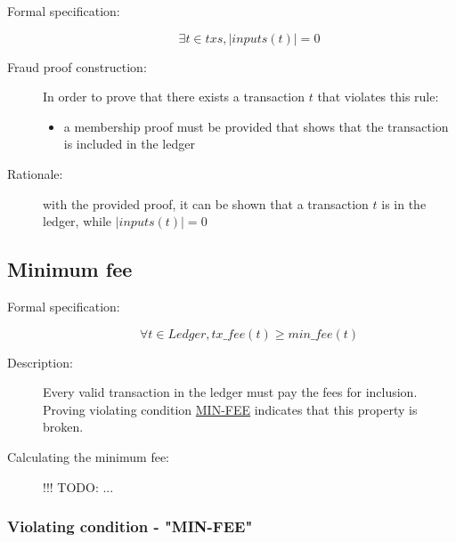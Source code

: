 \documentclass[../main.tex]{subfiles}
\begin{document}
\begin{description}

\item[Formal specification:]
\begin{equation*}
    \exists t \in txs, |inputs(t)| = 0
\end{equation*}

\item[Fraud proof construction:] In order to prove that there exists a transaction $t$ that violates this rule:
\begin{itemize}
    \item a membership proof must be provided that shows that the transaction is included in the ledger
\end{itemize}

\item[Rationale:] with the provided proof, it can be shown that a transaction $t$ is in the ledger, while $|inputs(t)| = 0$

\end{description}

\subsection{Minimum fee}

\begin{description}

\item[Formal specification:]
\begin{equation*}
    \forall t \in Ledger, tx\_fee(t) \geq min\_fee(t)
\end{equation*}

\item[Description:] Every valid transaction in the ledger must pay the fees for inclusion.
  Proving violating condition \hyperref[sec:MIN-FEE]{MIN-FEE} indicates that this property is broken.

\item[Calculating the minimum fee:] !!! TODO: ...

\end{description}

\subsubsection{Violating condition - "MIN-FEE"}
\label{sec:MIN-FEE}
\end{document}
